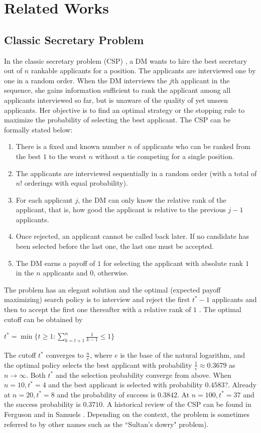 \documentclass[conference]{IEEEtran}
\theoremstyle{definition}
\begin{document}
\section{Related Works} \label{related}
\subsection{Classic Secretary Problem}
In the classic secretary problem (CSP) \cite{CSP}, a DM wants to hire the best secretary out of $n$ rankable applicants for a position. The applicants are interviewed one by one in a random order.  When the DM interviews the $j$th applicant in the sequence, she gains information sufficient to rank the applicant among all applicants interviewed so far, but is unaware of the quality of yet unseen applicants.   Her objective is to find an optimal strategy or the stopping rule to maximize the probability of selecting the best applicant. The CSP can be formally stated below:

\begin{enumerate}
\item  There is a fixed and known number $n$ of applicants who can be ranked from the best $1$ to the worst $n$ without a tie competing for a single position.
\item The applicants are interviewed sequentially in a random order (with a total of $n!$ orderings with equal probability).
\item For each applicant $j$, the DM can only know the relative rank of the applicant, that is, how good the applicant is relative to the previous $j-1$ applicants.
\item Once rejected, an applicant cannot be called back later. If no candidate has been selected before the last one, the last one must be accepted.
\item The DM earns a payoff of $1$ for selecting the applicant with absolute rank $1$ in the $n$ applicants and $0$, otherwise.
\end{enumerate}


The problem has an elegant solution and the optimal (expected payoff maximizing) search policy is to interview and reject the first $t^{*}-1$ applicants and then to accept the first one thereafter with a relative rank of $1$ \cite{Gilbert1966}. The optimal cutoff can be obtained by

$t^{*} = \min \{t \geq 1: \sum_{k=t+1}^{n} \frac{1}{k-1} \leq 1\} $

The cutoff $t^{*}$ converges to $\frac {n}{e}$, where $e$ is the base of the natural logarithm, and the optimal policy selects the best applicant with probability $\frac {1} {e} \approx 0.3679$ as $n \rightarrow \infty$. Both $t^{*}$ and the selection probability converge from above. When $n=10, t^{*}=4$ and the best applicant is selected with probability $0.4583$?. Already at $n=20, t^{*}=8$ and the probability of success is $0.3842$. At $n=100, t^{*}=37$ and the success probability is $0.3710$. A historical review of the CSP can be found in Ferguson \cite{Ferguson1989} and in Samuels \cite{Samuels1992}. Depending on the context, the problem is sometimes referred to by other names such as the ``Sultan’s dowry" problem).
\end{document}
